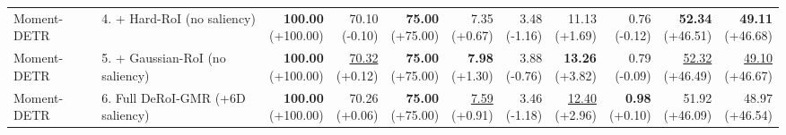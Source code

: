 \documentclass{article}
\begin{document}
{\begin{tabular}{llrrrrrrrrr}
Moment-DETR & 4. + Hard-RoI (no saliency) & \shortstack{\textbf{100.00} \\ {\scriptsize (+100.00)}} & \shortstack{70.10 \\ {\scriptsize (-0.10)}} & \shortstack{\textbf{75.00} \\ {\scriptsize (+75.00)}} & \shortstack{7.35 \\ {\scriptsize (+0.67)}} & \shortstack{3.48 \\ {\scriptsize (-1.16)}} & \shortstack{11.13 \\ {\scriptsize (+1.69)}} & \shortstack{0.76 \\ {\scriptsize (-0.12)}} & \shortstack{\textbf{52.34} \\ {\scriptsize (+46.51)}} & \shortstack{\textbf{49.11} \\ {\scriptsize (+46.68)}} \\
Moment-DETR & 5. + Gaussian-RoI (no saliency) & \shortstack{\textbf{100.00} \\ {\scriptsize (+100.00)}} & \shortstack{\underline{70.32} \\ {\scriptsize (+0.12)}} & \shortstack{\textbf{75.00} \\ {\scriptsize (+75.00)}} & \shortstack{\textbf{7.98} \\ {\scriptsize (+1.30)}} & \shortstack{3.88 \\ {\scriptsize (-0.76)}} & \shortstack{\textbf{13.26} \\ {\scriptsize (+3.82)}} & \shortstack{0.79 \\ {\scriptsize (-0.09)}} & \shortstack{\underline{52.32} \\ {\scriptsize (+46.49)}} & \shortstack{\underline{49.10} \\ {\scriptsize (+46.67)}} \\
Moment-DETR & 6. Full DeRoI-GMR (+6D saliency) & \shortstack{\textbf{100.00} \\ {\scriptsize (+100.00)}} & \shortstack{70.26 \\ {\scriptsize (+0.06)}} & \shortstack{\textbf{75.00} \\ {\scriptsize (+75.00)}} & \shortstack{\underline{7.59} \\ {\scriptsize (+0.91)}} & \shortstack{3.46 \\ {\scriptsize (-1.18)}} & \shortstack{\underline{12.40} \\ {\scriptsize (+2.96)}} & \shortstack{\textbf{0.98} \\ {\scriptsize (+0.10)}} & \shortstack{51.92 \\ {\scriptsize (+46.09)}} & \shortstack{48.97 \\ {\scriptsize (+46.54)}} \\

\end{tabular}}
\end{document}
